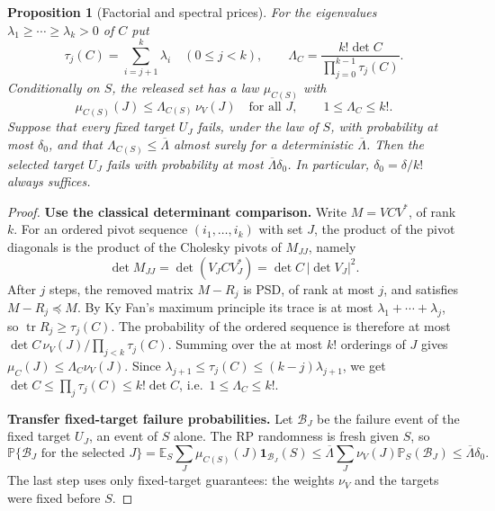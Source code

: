 \documentclass[11pt,a4paper]{article}
\newtheorem{proposition}[theorem]{Proposition}
\theoremstyle{definition}
\theoremstyle{remark}
\newcommand{\E}{\mathbb E}
\newcommand{\Prob}{\mathbb P}
\newcommand{\tr}{\operatorname{tr}}
\newcommand{\1}{\mathbf 1}
\newcommand{\proofstep}[1]{\par\medskip\noindent\textbf{#1}\enspace}
\newcommand{\Lbar}{\overline\Lambda}
\begin{document}
\begin{proposition}[Factorial and spectral prices]\label{prop:gate}
For the eigenvalues $\lambda_1\ge\cdots\ge\lambda_k>0$ of $C$ put
\[
 \tau_j(C)=\sum_{i=j+1}^k\lambda_i\quad(0\le j<k),\qquad
 \Lambda_C=\frac{k!\det C}{\prod_{j=0}^{k-1}\tau_j(C)}.
\]
Conditionally on $S$, the released set has a law $\mu_{C(S)}$ with
\[
 \mu_{C(S)}(J)\le\Lambda_{C(S)}\,\nu_V(J)\quad\text{for all }J,
 \qquad 1\le\Lambda_C\le k!.
\]
Suppose that every fixed target $U_J$ fails, under the law of $S$, with
probability at most $\delta_0$, and that $\Lambda_{C(S)}\le\Lbar$ almost
surely for a deterministic $\Lbar$. Then the selected target $U_J$ fails
with probability at most $\Lbar\delta_0$. In particular,
$\delta_0=\delta/k!$ always suffices.
\end{proposition}
\begin{proof}
\proofstep{Use the classical determinant comparison.}
Write $M=VCV^*$, of rank $k$. For an ordered pivot sequence
$(i_1,\ldots,i_k)$ with set $J$, the product of the pivot diagonals is
the product of the Cholesky pivots of $M_{JJ}$, namely
\[
 \det M_{JJ}=\det(V_JCV_J^*)=\det C\,|\det V_J|^2 .
\]
After $j$ steps, the removed matrix $M-R_j$ is PSD, of rank at most $j$,
and satisfies $M-R_j\preceq M$. By Ky Fan's maximum principle its trace
is at most $\lambda_1+\cdots+\lambda_j$, so $\tr R_j\ge\tau_j(C)$. The
probability of the ordered sequence is therefore at most
$\det C\,\nu_V(J)/\prod_{j<k}\tau_j(C)$. Summing over the at most $k!$
orderings of $J$ gives $\mu_C(J)\le\Lambda_C\nu_V(J)$. Since
$\lambda_{j+1}\le\tau_j(C)\le(k-j)\lambda_{j+1}$, we get
$\det C\le\prod_j\tau_j(C)\le k!\det C$, i.e.\ $1\le\Lambda_C\le k!$.

\proofstep{Transfer fixed-target failure probabilities.}
Let $\mathcal B_J$ be the failure event of the fixed target $U_J$, an
event of $S$ alone. The RP randomness is fresh given $S$, so
\[
 \Prob\{\mathcal B_J\text{ for the selected }J\}
 =\E_S\sum_J\mu_{C(S)}(J)\1_{\mathcal B_J}(S)
 \le\Lbar\sum_J\nu_V(J)\Prob_S(\mathcal B_J)\le\Lbar\delta_0 .
\]
The last step uses only fixed-target guarantees: the weights $\nu_V$
and the targets were fixed before $S$.
\end{proof}
\end{document}
